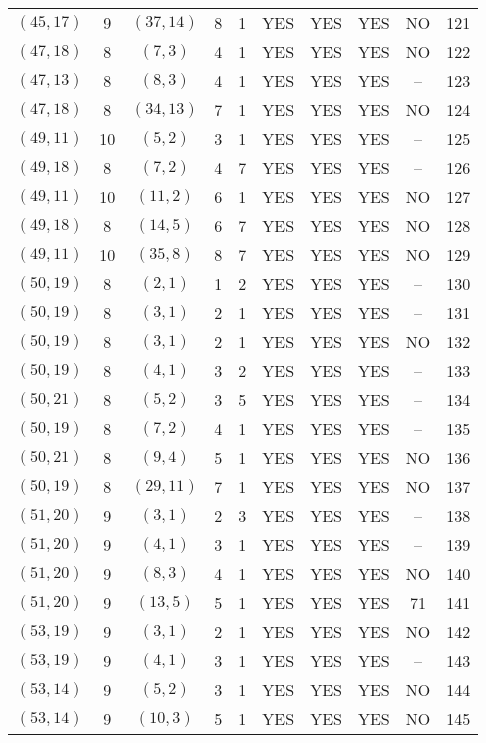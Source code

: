 \begin{longtable}{|c|c|c|c|c|c|c|c|c|c|}
$(45, 17)$ & 9 & $(37, 14)$ & 8 & 1 & YES & YES & YES & NO & 121\\
$(47, 18)$ & 8 & $(7, 3)$ & 4 & 1 & YES & YES & YES & NO & 122\\
$(47, 13)$ & 8 & $(8, 3)$ & 4 & 1 & YES & YES & YES & -- & 123\\
$(47, 18)$ & 8 & $(34, 13)$ & 7 & 1 & YES & YES & YES & NO & 124\\
$(49, 11)$ & 10 & $(5, 2)$ & 3 & 1 & YES & YES & YES & -- & 125\\
$(49, 18)$ & 8 & $(7, 2)$ & 4 & 7 & YES & YES & YES & -- & 126\\
$(49, 11)$ & 10 & $(11, 2)$ & 6 & 1 & YES & YES & YES & NO & 127\\
$(49, 18)$ & 8 & $(14, 5)$ & 6 & 7 & YES & YES & YES & NO & 128\\
$(49, 11)$ & 10 & $(35, 8)$ & 8 & 7 & YES & YES & YES & NO & 129\\
$(50, 19)$ & 8 & $(2, 1)$ & 1 & 2 & YES & YES & YES & -- & 130\\
$(50, 19)$ & 8 & $(3, 1)$ & 2 & 1 & YES & YES & YES & -- & 131\\
$(50, 19)$ & 8 & $(3, 1)$ & 2 & 1 & YES & YES & YES & NO & 132\\
$(50, 19)$ & 8 & $(4, 1)$ & 3 & 2 & YES & YES & YES & -- & 133\\
$(50, 21)$ & 8 & $(5, 2)$ & 3 & 5 & YES & YES & YES & -- & 134\\
$(50, 19)$ & 8 & $(7, 2)$ & 4 & 1 & YES & YES & YES & -- & 135\\
$(50, 21)$ & 8 & $(9, 4)$ & 5 & 1 & YES & YES & YES & NO & 136\\
$(50, 19)$ & 8 & $(29, 11)$ & 7 & 1 & YES & YES & YES & NO & 137\\
$(51, 20)$ & 9 & $(3, 1)$ & 2 & 3 & YES & YES & YES & -- & 138\\
$(51, 20)$ & 9 & $(4, 1)$ & 3 & 1 & YES & YES & YES & -- & 139\\
$(51, 20)$ & 9 & $(8, 3)$ & 4 & 1 & YES & YES & YES & NO & 140\\
$(51, 20)$ & 9 & $(13, 5)$ & 5 & 1 & YES & YES & YES & 71 & 141\\
$(53, 19)$ & 9 & $(3, 1)$ & 2 & 1 & YES & YES & YES & NO & 142\\
$(53, 19)$ & 9 & $(4, 1)$ & 3 & 1 & YES & YES & YES & -- & 143\\
$(53, 14)$ & 9 & $(5, 2)$ & 3 & 1 & YES & YES & YES & NO & 144\\
$(53, 14)$ & 9 & $(10, 3)$ & 5 & 1 & YES & YES & YES & NO & 145\\

\end{longtable}

